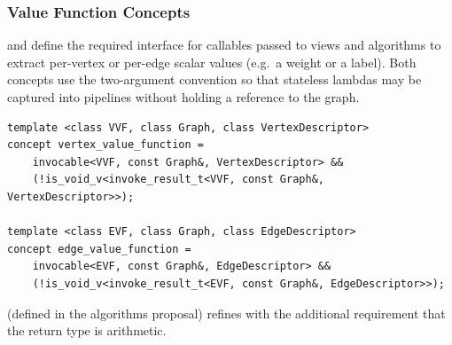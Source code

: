 %

\subsubsection{Value Function Concepts}

 and  define the required
interface for callables passed to views and algorithms to extract per-vertex or per-edge
scalar values (e.g.\ a weight or a label). Both concepts use the two-argument
 convention so that stateless lambdas may be captured
into  pipelines without holding a reference to the graph.

\begin{lstlisting}
template <class VVF, class Graph, class VertexDescriptor>
concept vertex_value_function =
    invocable<VVF, const Graph&, VertexDescriptor> &&
    (!is_void_v<invoke_result_t<VVF, const Graph&, VertexDescriptor>>);

template <class EVF, class Graph, class EdgeDescriptor>
concept edge_value_function =
    invocable<EVF, const Graph&, EdgeDescriptor> &&
    (!is_void_v<invoke_result_t<EVF, const Graph&, EdgeDescriptor>>);
\end{lstlisting}

 (defined in the algorithms proposal) refines
 with the additional requirement that the return type is
arithmetic.

